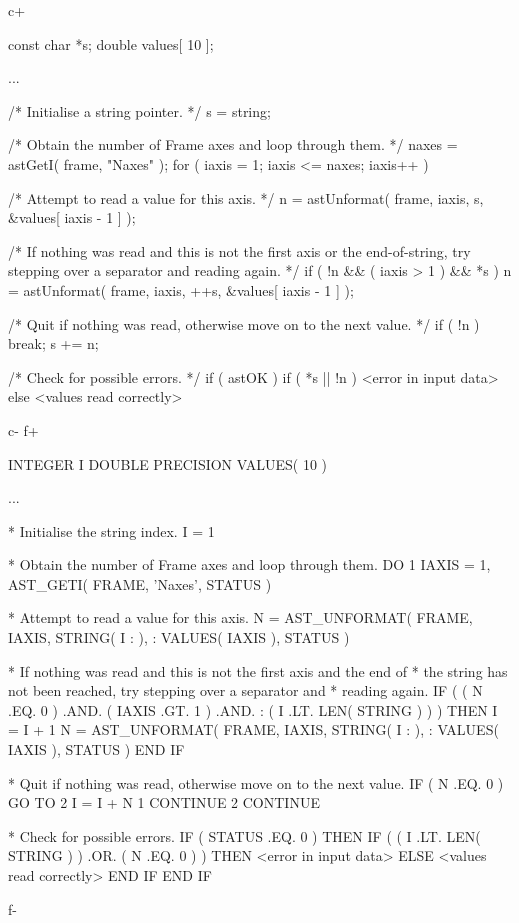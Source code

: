 \documentclass[twoside,11pt]{starlink}
\begin{document}
c+
\small
\begin{terminalv}
const char *s;
double values[ 10 ];

...

/* Initialise a string pointer. */
s = string;

/* Obtain the number of Frame axes and loop through them. */
naxes = astGetI( frame, "Naxes" );
for ( iaxis = 1; iaxis <= naxes; iaxis++ ) {

/* Attempt to read a value for this axis. */
   n = astUnformat( frame, iaxis, s, &values[ iaxis - 1 ] );

/* If nothing was read and this is not the first axis or the
   end-of-string, try stepping over a separator and reading again. */
   if ( !n && ( iaxis > 1 ) && *s )
      n = astUnformat( frame, iaxis, ++s, &values[ iaxis - 1 ] );

/* Quit if nothing was read, otherwise move on to the next value. */
   if ( !n ) break;
   s += n;
}

/* Check for possible errors. */
if ( astOK ) {
   if ( *s || !n ) {
      <error in input data>
   } else {
      <values read correctly>
   }
}
\end{terminalv}
\normalsize
c-
f+
\small
\begin{terminalv}
      INTEGER I
      DOUBLE PRECISION VALUES( 10 )

      ...

*  Initialise the string index.
      I = 1

*  Obtain the number of Frame axes and loop through them.
      DO 1 IAXIS = 1, AST_GETI( FRAME, 'Naxes', STATUS )

*  Attempt to read a value for this axis.
         N = AST_UNFORMAT( FRAME, IAXIS, STRING( I : ),
     :                     VALUES( IAXIS ), STATUS )

*  If nothing was read and this is not the first axis and the end of
*  the string has not been reached, try stepping over a separator and
*  reading again.
         IF ( ( N .EQ. 0 ) .AND. ( IAXIS .GT. 1 ) .AND.
     :        ( I .LT. LEN( STRING ) ) ) THEN
            I = I + 1
            N = AST_UNFORMAT( FRAME, IAXIS, STRING( I : ),
     :                        VALUES( IAXIS ), STATUS )
         END IF

*  Quit if nothing was read, otherwise move on to the next value.
         IF ( N .EQ. 0 ) GO TO 2
         I = I + N
 1    CONTINUE
 2    CONTINUE

*  Check for possible errors.
      IF ( STATUS .EQ. 0 ) THEN
         IF ( ( I .LT. LEN( STRING ) ) .OR. ( N .EQ. 0 ) ) THEN
            <error in input data>
         ELSE
            <values read correctly>
         END IF
      END IF
\end{terminalv}
\normalsize
f-
\end{document}
